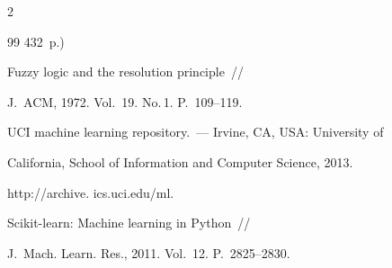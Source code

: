 \begin{multicols}{2}
{{\begin{thebibliography}{99}
432~p.)






{Fuzzy logic and the resolution principle}~//


    J.~ACM, 1972. Vol.~19. No.\,1. P.~109--119.























    {{UCI} machine learning repository}.~--- Irvine, CA, USA: University of 


    California, School of Information and Computer Science, 2013. 


    {\sf http://archive. ics.uci.edu/ml}.






{Scikit-learn: Machine learning in {P}ython}~//


{J.~Mach. Learn. Res.}, 2011. Vol.~12. P.~2825--2830.








 \end{thebibliography}





 }


 }





\end{multicols}





